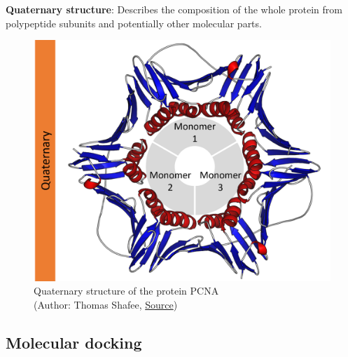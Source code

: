 \textbf{Quaternary structure}: Describes the composition of the whole protein from polypeptide subunits and potentially other molecular parts.

\begin{figure}[H]
    \centering
    \includegraphics[width=\textwidth]{figures/bioinformatics/protein_structure_quaternary.png}
    \caption{Quaternary structure of the protein PCNA\\(Author: Thomas Shafee, \href{https://en.wikipedia.org/wiki/File:Protein\_structure\_(full).png}{Source})}
\end{figure}

\subsection{Molecular docking}

